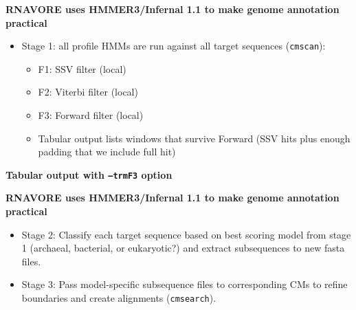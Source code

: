\documentclass[landscape]{slides}
\begin{document}
\begin{slide}
\begin{center}
\small
\textbf{RNAVORE uses HMMER3/Infernal 1.1 to make genome annotation practical}
\end{center}

\begin{itemize}
\item Stage 1: all profile HMMs are run against all target
  sequences (\texttt{cmscan}): 
\begin{itemize}
\item F1:  SSV filter (local)
\item F2: Viterbi filter (local)
\item F3: Forward filter (local)
\item Tabular output lists windows that survive Forward (SSV hits plus
  enough padding that we include full hit)
\end{itemize}
\end{itemize}

\vfill
\end{slide}
\begin{slide}
\begin{center}
\small
\textbf{Tabular output with \texttt{--trmF3} option}
\end{center}


\vfill
\end{slide}
\begin{slide}
\begin{center}
\small
\textbf{RNAVORE uses HMMER3/Infernal 1.1 to make genome annotation practical}
\end{center}

\begin{itemize}
\item Stage 2: Classify each target sequence based on best scoring
  model from stage 1 (archaeal, bacterial, or eukaryotic?) and extract
  subsequences to new fasta files.
\item Stage 3: Pass model-specific subsequence files to corresponding
  CMs to refine boundaries and create alignments
  (\texttt{cmsearch}).
\end{itemize}

\vfill
\end{slide}
\end{document}
